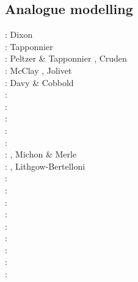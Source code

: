 \subsection{Analogue modelling}

{\scriptsize
\nineteenseventyfive: Dixon \cite{dixo75}\\
\nineteeneightytwo: Tapponnier \etal \cite{tapl82}\\
\nineteeneightyeight: Peltzer \& Tapponnier \cite{peta88}, Cruden \cite{crud88}\\
\nineteenninety: McClay \cite{mccl90}, Jolivet \etal \cite{jodc90}\\
\nineteenninetyone: Davy \& Cobbold \cite{daco91}\\
\nineteenninetytwo: \cite{salt92}\\
\nineteenninetythree: \cite{nabr93}\cite{shem93}\\
\nineteenninetyseven: \cite{vank97}\\
\nineteenninetyeight: \cite{bubr98}\\
\nineteenninetynine: \cite{dava99}\cite{befo99}\cite{fagd99}\cite{nagg99}\\
\twothousand: \cite{sche00}\cite{sobm00}\cite{chlb00}, Michon \& Merle \cite{mime00}\\
\twothousandone: \cite{haki01}\cite{chys01}, Lithgow-Bertelloni \cite{lirc01}\\
\twothousandtwo: \cite{dagl02}\\
\twothousandthree: \cite{smbs03}\cite{muso03}\cite{nagv03}\\
\twothousandfour: \cite{sche04}\cite{sche04b}\\
\twothousandfive: \cite{jujb05}\cite{sche05}\cite{sobb05}\\
\twothousandsix: \cite{scbb06}\cite{tibs06}\cite{crnp06}\cite{lemm06}\cite{pabs06}\cite{malm06}\\
\twothousandseven: \cite{socb07}\\
\twothousandeight: \cite{clbz08}\cite{fufh08}\cite{esfm08}\\
\twothousandnine: \cite{pina09}\cite{bonn09}\\
\twothousandeleven: \cite{dalt11}\cite{gopc11}\cite{grhd11}\\
}
